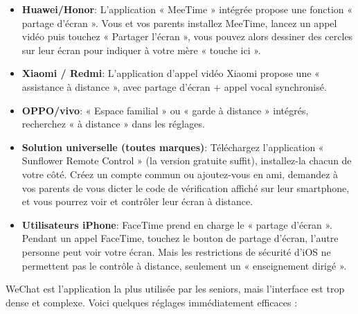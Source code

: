 \begin{itemize}
  \item \textbf{Huawei/Honor}: L'application « MeeTime » intégrée propose une fonction « partage d'écran ». Vous et vos parents installez MeeTime, lancez un appel vidéo puis touchez « Partager l'écran », vous pouvez alors dessiner des cercles sur leur écran pour indiquer à votre mère « touche ici ».
  \item \textbf{Xiaomi / Redmi}: L'application d'appel vidéo Xiaomi propose une « assistance à distance », avec partage d'écran + appel vocal synchronisé.
  \item \textbf{OPPO/vivo}: « Espace familial » ou « garde à distance » intégrés, recherchez « à distance » dans les réglages.
  \item \textbf{Solution universelle (toutes marques)}: Téléchargez l'application « Sunflower Remote Control » (la version gratuite suffit), installez-la chacun de votre côté. Créez un compte commun ou ajoutez-vous en ami, demandez à vos parents de vous dicter le code de vérification affiché sur leur smartphone, et vous pourrez voir et contrôler leur écran à distance.
  \item \textbf{Utilisateurs iPhone}: FaceTime prend en charge le « partage d'écran ». Pendant un appel FaceTime, touchez le bouton de partage d'écran, l'autre personne peut voir votre écran. Mais les restrictions de sécurité d'iOS ne permettent pas le contrôle à distance, seulement un « enseignement dirigé ».
\end{itemize}


WeChat est l'application la plus utilisée par les seniors, mais l'interface est trop dense et complexe. Voici quelques réglages immédiatement efficaces :

